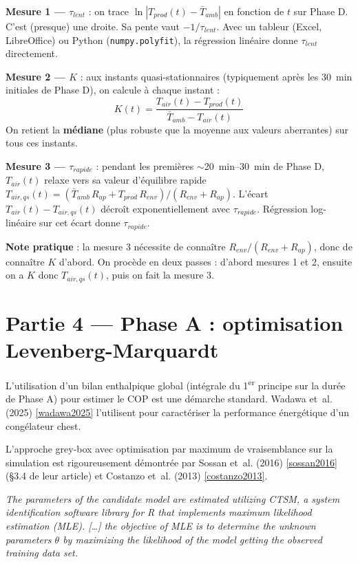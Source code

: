 \documentclass[11pt,a4paper]{article}
\begin{document}
\begin{exemple}
\textbf{Mesure 1 — $\tau_{lent}$} : on trace $\ln|T_{prod}(t) - \bar T_{amb}|$ en fonction
de $t$ sur Phase D. C'est (presque) une droite. Sa pente vaut $-1/\tau_{lent}$. Avec un
tableur (Excel, LibreOffice) ou Python (\verb|numpy.polyfit|), la régression linéaire
donne $\tau_{lent}$ directement.

\medskip
\textbf{Mesure 2 — $K$} : aux instants quasi-stationnaires (typiquement après les
\SI{30}{\minute} initiales de Phase D), on calcule à chaque instant :
$$K(t) = \frac{T_{air}(t) - T_{prod}(t)}{\bar T_{amb} - T_{air}(t)}$$
On retient la \textbf{médiane} (plus robuste que la moyenne aux valeurs aberrantes) sur tous
ces instants.

\medskip
\textbf{Mesure 3 — $\tau_{rapide}$} : pendant les premières $\sim$\SIrange{20}{30}{\minute}
de Phase D, $T_{air}(t)$ relaxe vers sa valeur d'équilibre rapide $T_{air,qs}(t) = (\bar T_{amb}
\,R_{ap} + T_{prod}\,R_{env})/(R_{env}+R_{ap})$. L'écart $T_{air}(t) - T_{air,qs}(t)$ décroît
exponentiellement avec $\tau_{rapide}$. Régression log-linéaire sur cet écart donne
$\tau_{rapide}$.

\medskip
\textbf{Note pratique} : la mesure 3 nécessite de connaître $R_{env}/(R_{env}+R_{ap})$, donc
de connaître $K$ d'abord. On procède en deux passes : d'abord mesures 1 et 2, ensuite on a
$K$ donc $T_{air,qs}(t)$, puis on fait la mesure 3.
\end{exemple}

\section{Partie 4 — Phase A : optimisation Levenberg-Marquardt}

L'utilisation d'un bilan enthalpique global (intégrale du 1\textsuperscript{er} principe sur
la durée de Phase A) pour estimer le COP est une démarche standard. Wadawa et~al. (2025)
\ref{wadawa2025} l'utilisent pour caractériser la performance énergétique d'un congélateur
chest.

L'approche grey-box avec optimisation par maximum de vraisemblance sur la simulation est
rigoureusement démontrée par Sossan et~al. (2016) \ref{sossan2016} (\S3.4 de leur article)
et Costanzo et~al. (2013) \ref{costanzo2013}.

\begin{tcolorbox}[breakable,enhanced jigsaw,colback=yellow!10,colframe=yellow!50!black,boxrule=0.4pt,arc=2pt,
title=\textbf{Extrait textuel — Sossan et~al.\ (2016) \ref{sossan2016}, \S3.4 (MLE)}]
\og{} \emph{The parameters of the candidate model are estimated utilizing CTSM, a system
identification software library for R that implements maximum likelihood estimation (MLE).
[\dots] the objective of MLE is to determine the unknown parameters $\theta$ by maximizing
the likelihood of the model getting the observed training data set.} \fg{}
\end{tcolorbox}
\end{document}
